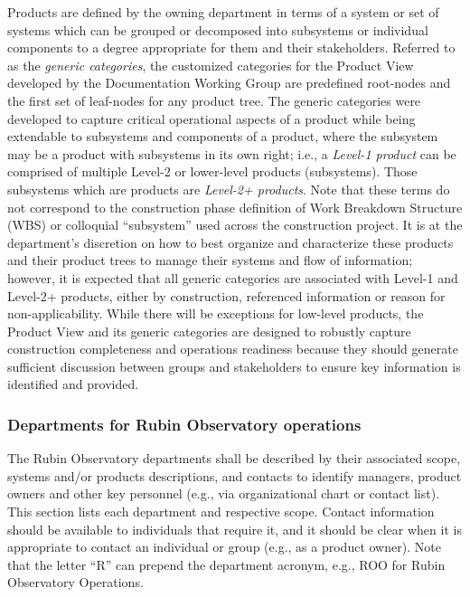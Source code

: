 Products are defined by the owning department in terms of a system or set of systems which can be grouped or decomposed into subsystems or individual components to a degree appropriate for them and their stakeholders.
Referred to as the \emph{generic categories}, the customized categories for the Product View developed by the Documentation Working Group are predefined root-nodes and the first set of leaf-nodes for any product tree.
The generic categories were developed to capture critical operational aspects of a product while being extendable to subsystems and components of a product, where the subsystem may be a product with subsystems in its own right; i.e., a \emph{Level-1 product} can be comprised of multiple Level-2 or lower-level products (subsystems).
Those subsystems which are products are \emph{Level-2+ products}.
Note that these terms do not correspond to the construction phase definition of Work Breakdown Structure (WBS) or colloquial ``subsystem'' used across the construction project.
It is at the department's discretion on how to best organize and characterize these products and their product trees to manage their systems and flow of information; however, it is expected that all generic categories are associated with Level-1 and Level-2+ products, either by construction, referenced information or reason for non-applicability.
While there will be exceptions for low-level products, the Product View and its generic categories are designed to robustly capture construction completeness and operations readiness because they should generate sufficient discussion between groups and stakeholders to ensure key information is identified and provided.

\subsubsection{Departments for Rubin Observatory operations}

The Rubin Observatory departments shall be described by their associated scope, systems and/or products descriptions, and contacts to identify managers, product owners and other key personnel (e.g., via organizational chart or contact list).
This section lists each department and respective scope.
Contact information should be available to individuals that require it, and it should be clear when it is appropriate to contact an individual or group (e.g., as a product owner).
Note that the letter ``R'' can prepend the department acronym, e.g., ROO for Rubin Observatory Operations.


